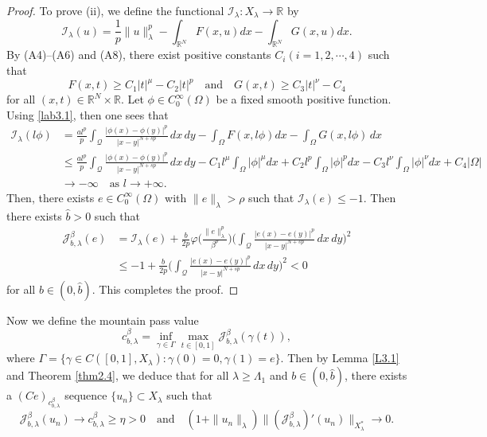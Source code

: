 \documentclass[reqno]{amsart}
\begin{document}
\begin{proof}
To prove (ii), we define the functional $\mathcal{I}_\lambda: X_\lambda\to  \mathbb{R}$ 
by
$$
\mathcal{I}_\lambda(u)=\frac{1}{p} \|u\|^p_\lambda
-\int_{\mathbb{R}^N}F(x,u)dx-\int_{\mathbb{R}^N}G(x,u)dx.
$$
By (A4)--(A6) and (A8), there exist positive constants $C_i(i=1, 2, \cdots,4)$
such that
\begin{equation}\label{lab3.1}
F(x,t)\geq C_1|t|^\mu- C_2|t|^p \quad \text{and}\quad G(x,t)\geq C_3|t|^\nu-C_4
\end{equation}
for all $(x,t)\in \mathbb R^N\times \mathbb R$.
Let $\phi\in C^\infty_0(\Omega)$ be a fixed smooth positive function. 
Using \eqref{lab3.1}, then one sees that
\begin{align*}
\mathcal{I}_\lambda(l\phi)
&= \frac{al^p}{p}\int_{\mathcal{Q}}\frac{|\phi(x)-\phi(y)|^p}{|x-y|^{N+sp}}\,dx\,dy
 -\int_{\Omega}F(x, l\phi)dx-\int_{\Omega}G(x,l\phi)\,dx  \\
&\leq \frac{al^p}{p}\int_{\mathcal{Q}}\frac{|\phi(x)-\phi(y)|^p}{|x-y|^{N+sp}}\,dx\,dy
 -C_1l^\mu\int_{\Omega}|\phi|^\mu dx+C_2l^p\int_{\Omega}|\phi|^pdx  
 -C_3l^\nu\int_{\Omega}|\phi|^\nu dx+C_4|\Omega|     \\
&\to -\infty\quad \text{as } l\to  +\infty.
\end{align*}
Then, there exists $e\in C^\infty_0(\Omega)$ with $\|e\|_\lambda>\rho$ such 
that $\mathcal{I}_\lambda(e)\leq -1$. 
Then there exists $\widehat{b}>0$ such that
\begin{align*}
 \mathcal{J}^\beta_{b,\lambda}(e)
&=\mathcal{I}_\lambda(e)+\frac{b}{2p}\varphi\Big( \frac{\|e\|^p_\lambda}{\beta^p}
 \Big)\Big(\int_{\mathcal{Q}}\frac{|e(x)-e(y)|^p}{|x-y|^{N+sp}}\,dx\,dy\Big)^2    \\
&\leq -1+\frac{b}{2p}\Big(\int_{\mathcal{Q}}\frac{|e(x)-e(y)|^p}{|x-y|^{N+sp}}\,dx\,dy
\Big)^2   <0
\end{align*}
for all $b\in(0, \widehat{b})$. This completes the proof.
\end{proof}

Now we define the mountain pass value
$$
c_{b,\lambda}^\beta=\inf_{\gamma\in\Gamma} 
\max_{t\in[0,1]}\mathcal{J}^\beta_{b,\lambda}(\gamma(t)),
$$
where $\Gamma=\{\gamma\in C([0,1], X_\lambda):\gamma(0)=0,\gamma(1)=e\}$. 
Then by Lemma \ref{L3.1} and Theorem \ref{thm2.4}, we deduce that for all 
$\lambda\geq\Lambda_1$ and $b\in(0, \widehat{b})$, there exists a 
$(Ce)_{c_{b,\lambda}^\beta}$ sequence $\{u_n\}\subset X_\lambda$ such that
\begin{equation}\label{lab3.2}
 \mathcal{J}^\beta_{b,\lambda}(u_n)\to  c_{b,\lambda}^\beta\geq \eta>0\quad
  \text{and}\quad (1+\|u_n\|_\lambda)\|(\mathcal{J}^\beta_{b,\lambda})'(u_n)
  \|_{X_\lambda^*}\to  0.
\end{equation}
\end{document}
